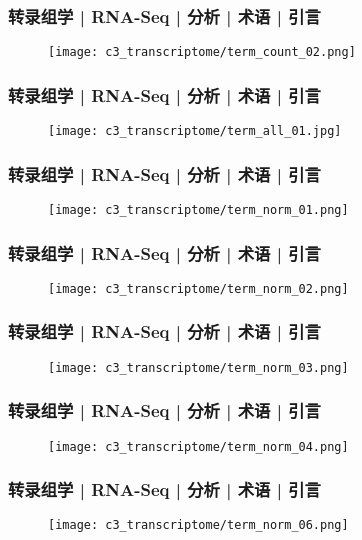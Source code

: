 \begin{frame}
  \frametitle{转录组学 | RNA-Seq | 分析 | 术语 | 引言}
  \begin{figure}
    \centering
    \texttt{[image: c3\_transcriptome/term\_count\_02.png]}
  \end{figure}
\end{frame}

\begin{frame}
  \frametitle{转录组学 | RNA-Seq | 分析 | 术语 | 引言}
  \begin{figure}
    \centering
    \texttt{[image: c3\_transcriptome/term\_all\_01.jpg]}
  \end{figure}
\end{frame}

\begin{frame}
  \frametitle{转录组学 | RNA-Seq | 分析 | 术语 | 引言}
  \begin{figure}
    \centering
    \texttt{[image: c3\_transcriptome/term\_norm\_01.png]}
  \end{figure}
\end{frame}

\begin{frame}
  \frametitle{转录组学 | RNA-Seq | 分析 | 术语 | 引言}
  \begin{figure}
    \centering
    \texttt{[image: c3\_transcriptome/term\_norm\_02.png]}
  \end{figure}
\end{frame}

\begin{frame}
  \frametitle{转录组学 | RNA-Seq | 分析 | 术语 | 引言}
  \begin{figure}
    \centering
    \texttt{[image: c3\_transcriptome/term\_norm\_03.png]}
  \end{figure}
\end{frame}

\begin{frame}
  \frametitle{转录组学 | RNA-Seq | 分析 | 术语 | 引言}
  \begin{figure}
    \centering
    \texttt{[image: c3\_transcriptome/term\_norm\_04.png]}
  \end{figure}
\end{frame}

\begin{frame}
  \frametitle{转录组学 | RNA-Seq | 分析 | 术语 | 引言}
  \begin{figure}
    \centering
    \texttt{[image: c3\_transcriptome/term\_norm\_06.png]}
  \end{figure}
\end{frame}

